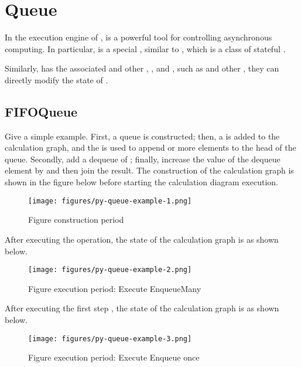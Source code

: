 \section{Queue}
\begin{content}
In the execution engine of ,  is a powerful tool for controlling asynchronous computing. In particular,  is a special , similar to , which is a class of stateful .

Similarly,  has the associated  and other , , and , such as  and other , they can directly modify the state of .


\subsection{FIFOQueue}
Give a simple example. First, a  queue is constructed; then, a  is added to the calculation graph, and the  is used to append  or more elements to the head of the queue. Secondly, add a dequeue of ; finally, increase the value of the dequeue element by  and then join the result. The construction of the calculation graph is shown in the figure below before starting the calculation diagram execution.

\begin{figure}[!h]
  \centering
  \texttt{[image: figures/py-queue-example-1.png]}
  \caption{Figure construction period}
  \label{fig:py-queue-example-1}
\end{figure}

After executing the  operation, the state of the calculation graph is as shown below.

\begin{figure}[!h]
  \centering
  \texttt{[image: figures/py-queue-example-2.png]}
  \caption{Figure execution period: Execute EnqueueMany}
  \label{fig:py-queue-example-2}
\end{figure}

After executing the first step , the state of the calculation graph is as shown below.

\begin{figure}[!h]
  \centering
  \texttt{[image: figures/py-queue-example-3.png]}
  \caption{Figure execution period: Execute Enqueue once}
  \label{fig:py-queue-example-3}
\end{figure}



\end{content}
